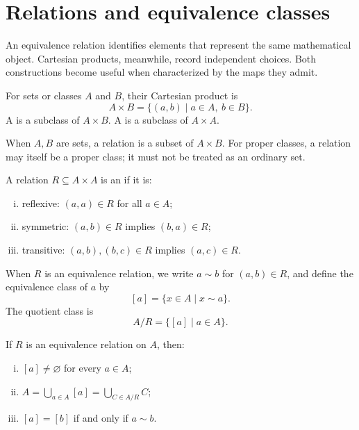 
\section{Relations and equivalence classes}

An equivalence relation identifies elements that represent the same mathematical object. Cartesian products, meanwhile, record independent choices. Both constructions become useful when characterized by the maps they admit.

\begin{definition}
For sets or classes \(A\) and \(B\), their Cartesian product is
\[
  A\times B=\{(a,b)\mid a\in A,\ b\in B\}.
\]
A  is a subclass of \(A\times B\).  A  is a subclass of \(A\times A\).
\end{definition}

\begin{caution}
When $A,B$ are sets, a relation is a subset of $A\times B$. For proper classes, a relation may itself be a proper class; it must not be treated as an ordinary set.
\end{caution}

\begin{definition}
A relation \(R\subseteq A\times A\) is an  if it is:
\begin{enumerate}[(i)]
  \item reflexive: \((a,a)\in R\) for all \(a\in A\);
  \item symmetric: \((a,b)\in R\) implies \((b,a)\in R\);
  \item transitive: \((a,b),(b,c)\in R\) implies \((a,c)\in R\).
\end{enumerate}
When \(R\) is an equivalence relation, we write \(a\sim b\) for \((a,b)\in R\), and define the equivalence class of \(a\) by
\[
  [a]=\{x\in A\mid x\sim a\}.
\]
The quotient class is
\[
  A/R=\{[a]\mid a\in A\}.
\]
\end{definition}

\begin{proposition}
If \(R\) is an equivalence relation on \(A\), then:
\begin{enumerate}[(i)]
  \item \([a]\neq\varnothing\) for every \(a\in A\);
  \item \(A=\bigcup_{a\in A}[a]=\bigcup_{C\in A/R}C\);
  \item \([a]=[b]\) if and only if \(a\sim b\).
\end{enumerate}
\end{proposition}

